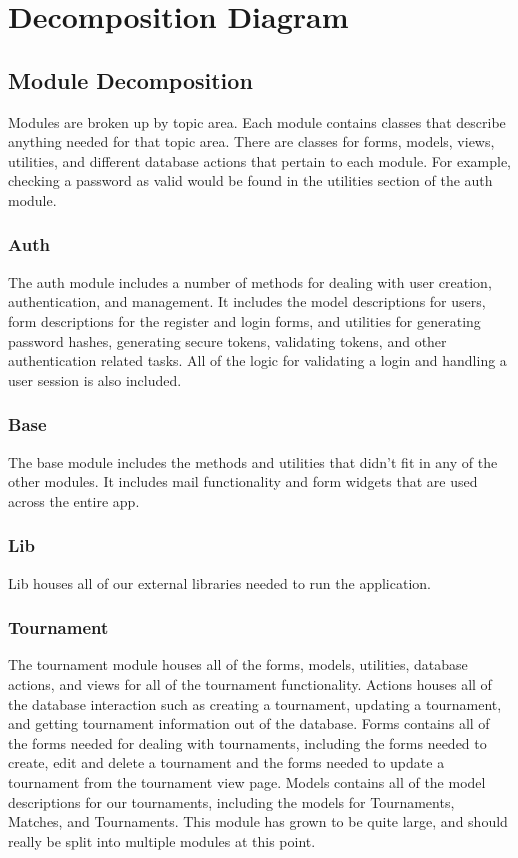 \documentclass{article}
\begin{document}
\newpage
\section{Decomposition Diagram}

\subsection{Module Decomposition}
Modules are broken up by topic area. Each module contains classes that describe anything needed for that topic area. There are classes for forms, models, views, utilities, and different database actions that pertain to each module. For example, checking a password as valid would be found in the utilities section of the auth module.

\subsubsection{Auth}
The auth module includes a number of methods for dealing with user creation, authentication, and management. It includes the model descriptions for users, form descriptions for the register and login forms, and utilities for generating password hashes, generating secure tokens, validating tokens, and other authentication related tasks. All of the logic for validating a login and handling a user session is also included.

\subsubsection{Base}
The base module includes the methods and utilities that didn’t fit in any of the other modules. It includes mail functionality and form widgets that are used across the entire app.

\subsubsection{Lib}
Lib houses all of our external libraries needed to run the application.

\subsubsection{Tournament}
The tournament module houses all of the forms, models, utilities, database actions, and views for all of the tournament functionality. Actions houses all of the database interaction such as creating a tournament, updating a tournament, and getting tournament information out of the database. Forms contains all of the forms needed for dealing with tournaments, including the forms needed to create, edit and delete a tournament and the forms needed to update a tournament from the tournament view page. Models contains all of the model descriptions for our tournaments, including the models for Tournaments, Matches, and Tournaments. This module has grown to be quite large, and should really be split into multiple modules at this point.
\end{document}
